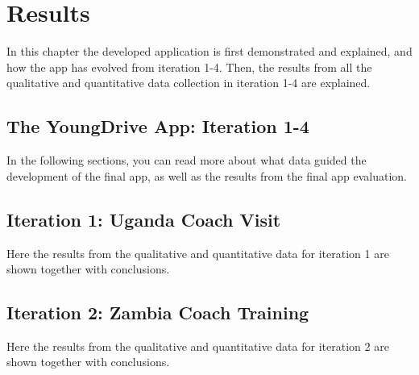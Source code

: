 \chapter{Results}\label{cha:Research}
%


In this chapter the developed application is first demonstrated and explained, and how the app has evolved from iteration 1-4. Then, the results from all the qualitative and quantitative data collection in iteration 1-4 are explained.


%

\section{The YoungDrive App: Iteration 1-4}\label{developed-application}

  

In the following sections, you can read more about what data guided the development of the final app, as well as the results from the final app evaluation.

\section{Iteration 1: Uganda Coach Visit}

Here the results from the qualitative and quantitative data for iteration 1 are shown together with conclusions.





\section{Iteration 2: Zambia Coach Training}

Here the results from the qualitative and quantitative data for iteration 2 are shown together with conclusions.





